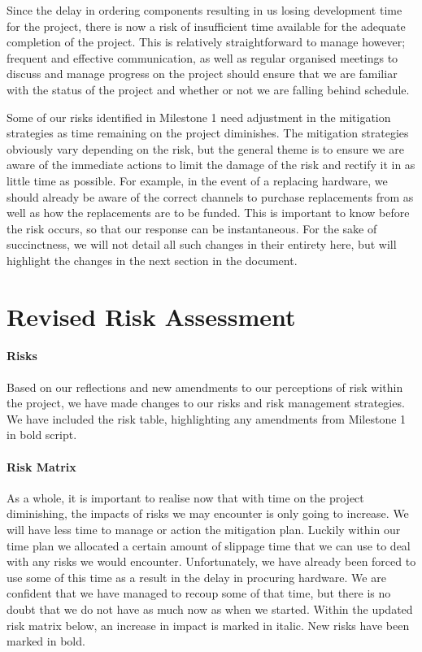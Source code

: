 Since the delay in ordering components resulting in us losing development time for the project, there is now a risk of insufficient time available for the adequate completion of the project. This is relatively straightforward to manage however; frequent and effective communication, as well as regular organised meetings to discuss and manage progress on the project should ensure that we are familiar with the status of the project and whether or not we are falling behind schedule. 

Some of our risks identified in Milestone 1 need adjustment in the mitigation strategies as time remaining on the project diminishes. The mitigation strategies obviously vary depending on the risk, but the general theme is to ensure we are aware of the immediate actions to limit the damage of the risk and rectify it in as little time as possible. For example, in the event of a replacing hardware, we should already be aware of the correct channels to purchase replacements from as well as how the replacements are to be funded. This is important to know before the risk occurs, so that our response can be instantaneous. For the sake of succinctness, we will not detail all such changes in their entirety here, but will highlight the changes in the next section in the document. 

\section{Revised Risk Assessment}

\paragraph{Risks}
Based on our reflections and new amendments to our perceptions of risk within the project, we have made changes to our risks and risk management strategies. We have included the risk table, highlighting any amendments from Milestone 1 \cite{coaker} in bold script.

\vspace{3em}  \vspace{6em}

\paragraph{Risk Matrix}
As a whole, it is important to realise now that with time on the project diminishing, the impacts of risks we may encounter is only going to increase. We will have less time to manage or action the mitigation plan. Luckily within our time plan we allocated a certain amount of slippage time that we can use to deal with any risks we would encounter. Unfortunately, we have already been forced to use some of this time as a result in the delay in procuring hardware. We are confident that we have managed to recoup some of that time, but there is no doubt that we do not have as much now as when we started. Within the updated risk matrix below, an increase in impact is marked in italic. New risks have been marked in bold.


\vspace{3em} 

